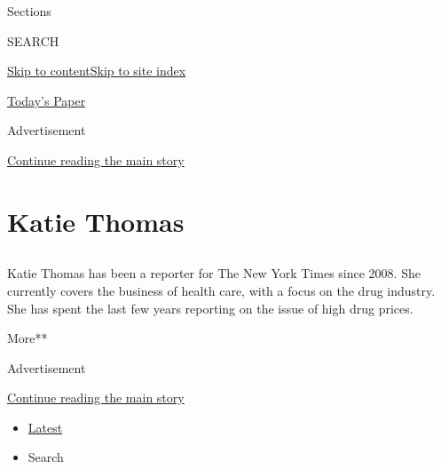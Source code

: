 Sections

SEARCH

\protect\hyperlink{site-content}{Skip to
content}\protect\hyperlink{site-index}{Skip to site index}

\href{https://myaccount.nytimes3xbfgragh.onion/auth/login?response_type=cookie\&client_id=vi}{}

\href{https://www.nytimes3xbfgragh.onion/section/todayspaper}{Today's
Paper}

Advertisement

\protect\hyperlink{after-top}{Continue reading the main story}

\hypertarget{katie-thomas}{%
\section{Katie Thomas}\label{katie-thomas}}

\subsection{}

Katie Thomas has been a reporter for The New York Times since 2008. She
currently covers the business of health care, with a focus on the drug
industry. She has spent the last few years reporting on the issue of
high drug prices.

More**

Advertisement

\protect\hyperlink{after-mid1}{Continue reading the main story}

\begin{itemize}
\tightlist
\item
  \protect\hyperlink{stream-panel}{Latest}
\item
  Search
\end{itemize}

